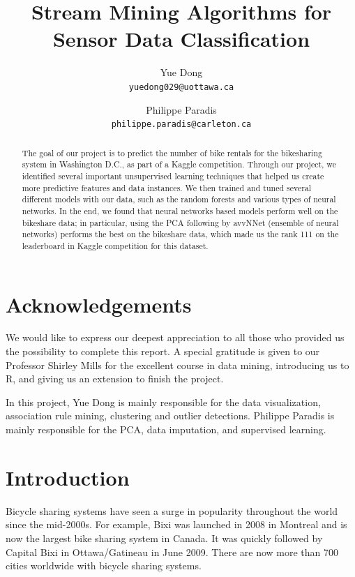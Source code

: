 \documentclass[12pt]{article}
\title{Stream Mining Algorithms for Sensor Data Classification}
\author{
	Yue Dong\\
	\texttt{yuedong029@uottawa.ca}
	\and
	Philippe Paradis\\
	\texttt{philippe.paradis@carleton.ca}
}
\begin{document}
	\singlespace
	\maketitle
	
	\tableofcontents
	\section*{Acknowledgements}
	We would like to express our deepest appreciation to all those who provided us the possibility to complete this report.  A special gratitude is given to our Professor Shirley Mills for the excellent course in data mining, introducing us to R, and giving us an extension to finish the project. 
	
	In this project, Yue Dong is mainly responsible for the data visualization, association rule mining, clustering and outlier detections. Philippe Paradis is mainly responsible for the PCA, data imputation, and supervised learning.  
\newpage 
	\begin{abstract}                %
	The goal of our project is to predict the number of bike rentals for the bikesharing system in Washington D.C.,
	as part of a Kaggle competition. Through our project, we identified several important unsupervised learning techniques that helped us create more predictive features and data instances. We then trained and tuned several different models  with our data, such as the random forests and various types of neural networks. In the end, we found that neural networks based models perform well on the bikeshare data; in particular, using the PCA following by avvNNet (ensemble of neural networks) performs the best on
	the bikeshare data, which made us the rank 111 on the leaderboard in Kaggle competition for this dataset.	
		
	\end{abstract}
	
	\setcounter{secnumdepth}{4}
	
	\section{Introduction}
	\label{sec:introduction}

Bicycle sharing systems have seen a surge in popularity throughout the world since the mid-2000s. For example, Bixi was launched in 2008 in Montreal and is now the largest bike sharing system in Canada. It was quickly followed by Capital Bixi in Ottawa/Gatineau in June 2009. There are now more than 700 cities worldwide with bicycle sharing systems. 
        
\end{document}
